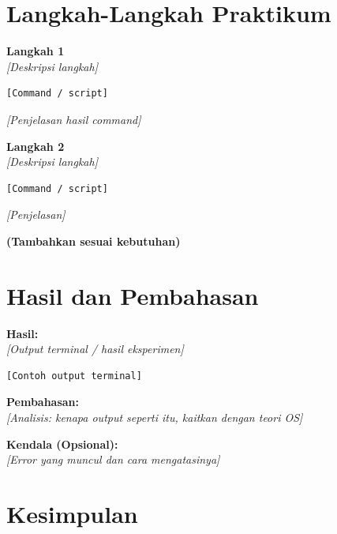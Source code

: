 \section{Langkah-Langkah Praktikum}

\noindent
\textbf{Langkah 1}\\
\textit{[Deskripsi langkah]}\\

\begin{verbatim}
[Command / script]
\end{verbatim}

\textit{[Penjelasan hasil command]}

\vspace{0.3cm}

\textbf{Langkah 2}\\
\textit{[Deskripsi langkah]}\\

\begin{verbatim}
[Command / script]
\end{verbatim}

\textit{[Penjelasan]}

\vspace{0.3cm}

\textbf{(Tambahkan sesuai kebutuhan)}

\section{Hasil dan Pembahasan}

\noindent
\textbf{Hasil:}\\
\textit{[Output terminal / hasil eksperimen]}\\

\begin{verbatim}
[Contoh output terminal]
\end{verbatim}

\vspace{0.3cm}

\textbf{Pembahasan:}\\
\textit{[Analisis: kenapa output seperti itu, kaitkan dengan teori OS]}\\

\vspace{0.3cm}

\textbf{Kendala (Opsional):}\\
\textit{[Error yang muncul dan cara mengatasinya]}

\section{Kesimpulan}

